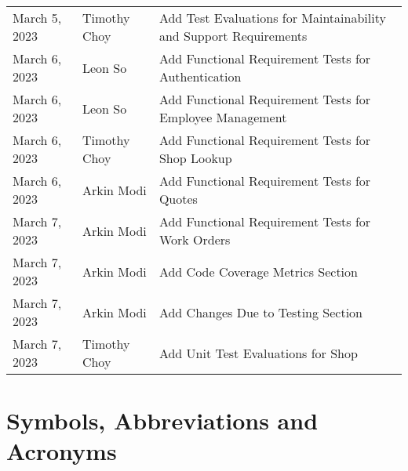 \documentclass[12pt, titlepage]{article}
\begin{document}
\begin{table}[hp]
\begin{tabularx}{\textwidth}{llX}
		March 5, 2023     & Timothy Choy          & Add Test Evaluations for Maintainability and Support Requirements \\
		March 6, 2023     & Leon So               & Add Functional Requirement Tests for Authentication               \\
		March 6, 2023     & Leon So               & Add Functional Requirement Tests for Employee Management          \\
		March 6, 2023     & Timothy Choy          & Add Functional Requirement Tests for Shop Lookup                  \\
		March 6, 2023     & Arkin Modi            & Add Functional Requirement Tests for Quotes                       \\
		March 7, 2023     & Arkin Modi            & Add Functional Requirement Tests for Work Orders                  \\
		March 7, 2023     & Arkin Modi            & Add Code Coverage Metrics Section                                 \\
		March 7, 2023     & Arkin Modi            & Add Changes Due to Testing Section                                \\
		March 7, 2023     & Timothy Choy          & Add Unit Test Evaluations for Shop                                \\
		\bottomrule
	\end{tabularx}
\end{table}
\newpage

\section{Symbols, Abbreviations and Acronyms}
\end{document}

